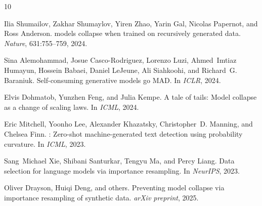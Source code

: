 \documentclass[11pt,a4paper]{article}
\begin{document}


\begin{thebibliography}{10}

Ilia Shumailov, Zakhar Shumaylov, Yiren Zhao, Yarin Gal, Nicolas Papernot, and Ross Anderson.
 models collapse when trained on recursively generated data.
\newblock \emph{Nature}, 631:755--759, 2024.

Sina Alemohammad, Josue Casco-Rodriguez, Lorenzo Luzi, Ahmed~Imtiaz Humayun, Hossein Babaei, Daniel LeJeune, Ali Siahkoohi, and Richard~G. Baraniuk.
\newblock Self-consuming generative models go {MAD}.
\newblock In \emph{ICLR}, 2024.

Elvis Dohmatob, Yunzhen Feng, and Julia Kempe.
\newblock A tale of tails: Model collapse as a change of scaling laws.
\newblock In \emph{ICML}, 2024.

Eric Mitchell, Yoonho Lee, Alexander Khazatsky, Christopher~D. Manning, and Chelsea Finn.
: Zero-shot machine-generated text detection using probability curvature.
\newblock In \emph{ICML}, 2023.

Sang~Michael Xie, Shibani Santurkar, Tengyu Ma, and Percy Liang.
\newblock Data selection for language models via importance resampling.
\newblock In \emph{NeurIPS}, 2023.

Oliver Drayson, Huiqi Deng, and others.
\newblock Preventing model collapse via importance resampling of synthetic data.
\newblock \emph{arXiv preprint}, 2025.

\end{thebibliography}
\end{document}
